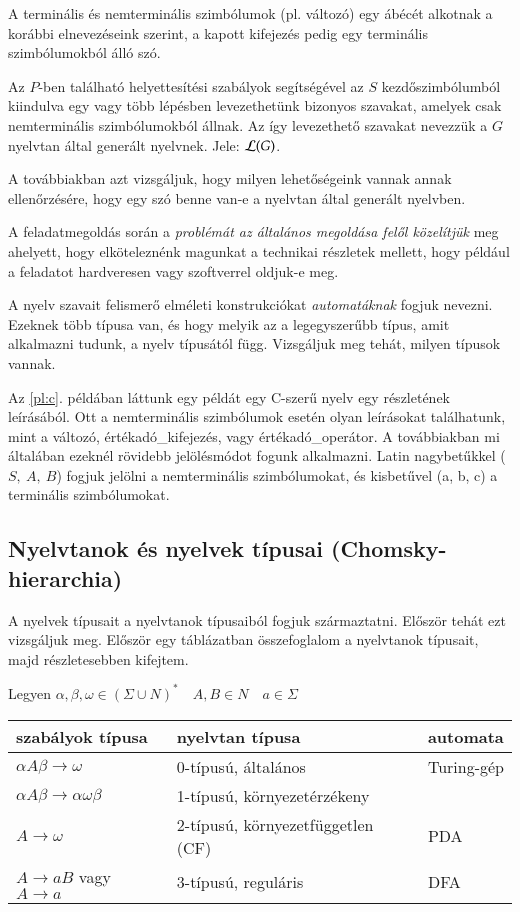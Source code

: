 \documentclass[a4paper]{article}
\begin{document}
A terminális és nemterminális szimbólumok (pl. változó) egy ábécét
alkotnak a korábbi elnevezéseink szerint, a kapott kifejezés pedig egy
terminális szimbólumokból álló szó.

Az $P$-ben található helyettesítési szabályok segítségével az $S$
kezdőszimbólumból kiindulva egy vagy több lépésben levezethetünk
bizonyos szavakat, amelyek csak nemterminális szimbólumokból állnak. Az
így levezethető szavakat nevezzük a $G$ nyelvtan által generált
nyelvnek.  Jele: ${\cal L}(G)$.

A továbbiakban azt vizsgáljuk, hogy milyen lehetőségeink vannak annak
ellenőrzésére, hogy egy szó benne van-e a nyelvtan által generált
nyelvben.

A feladatmegoldás során a \emph{problémát az általános megoldása felől
közelítjük} meg ahelyett, hogy elköteleznénk magunkat a technikai
részletek mellett, hogy például a feladatot hardveresen vagy szoftverrel
oldjuk-e meg.

A nyelv szavait felismerő elméleti konstrukciókat \emph{automatáknak}
fogjuk nevezni. Ezeknek több típusa van, és hogy melyik az a
legegyszerűbb típus, amit alkalmazni tudunk, a nyelv típusától függ.
Vizsgáljuk meg tehát, milyen típusok vannak.

Az \ref{pl:c}.  példában láttunk egy példát egy C-szerű nyelv egy
részletének leírásából.  Ott a nemterminális szimbólumok esetén olyan
leírásokat találhatunk, mint  a változó, értékadó\_kifejezés, vagy
értékadó\_operátor. A továbbiakban mi általában ezeknél rövidebb
jelölésmódot fogunk alkalmazni. Latin nagybetűkkel ($S,\:A,\:B$) fogjuk
jelölni a nemterminális szimbólumokat, és kisbetűvel (a, b, c) a
terminális szimbólumokat.

\subsection*{Nyelvtanok és nyelvek típusai (Chomsky-hierarchia)}

A nyelvek típusait a nyelvtanok típusaiból fogjuk származtatni. Először
tehát ezt vizsgáljuk meg.  Először egy táblázatban összefoglalom a
nyelvtanok típusait, majd részletesebben kifejtem.

Legyen $\alpha, \beta, \omega \in (\Sigma \cup N)^* \quad A, B \in N
\quad a \in \Sigma$

\begin{tabular}{|lll|}
\hline
szabályok típusa & nyelvtan típusa&automata\\
\hline
$\alpha A \beta \to \omega$ & 0-típusú, általános&Turing-gép\\
$\alpha A \beta \to \alpha\omega\beta$ & 1-típusú, környezetérzékeny&\\
$A \to \omega$ & 2-típusú, környezetfüggetlen (CF)&PDA\\
$A \to aB$ vagy $A \to a$ & 3-típusú, reguláris&DFA\\
\hline
\end{tabular}
\end{document}
